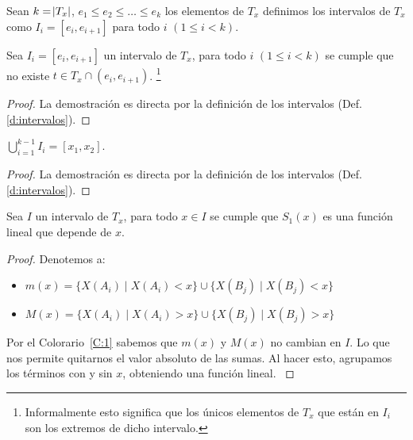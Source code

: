 \begin{definition}
    Sean $k = \abs{T_x}$, $e_1 \le e_2 \le \ldots \le e_k$ los elementos de $T_x$ definimos los intervalos de $T_x$ como $I_{i} = [ e_i, e_{i+1}]$ para todo $i$ $(1 \le i < k)$.
    \label{d:intervalos}
\end{definition}

\begin{collorary}
    Sea $I_i = [e_i, e_{i+1}]$ un intervalo de $T_x$, para todo $i$ $(1 \le i < k)$ se cumple que no existe $t \in T_x \cap (e_i, e_{i+1})$. \footnote{Informalmente esto significa que los únicos elementos de $T_x$ que están en $I_i$ son los extremos de dicho intervalo.}
    \label{C:1}
\end{collorary}

\begin{proof}
    La demostración es directa por la definición de los intervalos (Def. \ref{d:intervalos}).
\end{proof}

\begin{collorary}
    $\displaystyle \bigcup_{i=1}^{k-1} I_i = [x_1, x_2]$.
    \label{C:2}
\end{collorary}

\begin{proof}
    La demostración es directa por la definición de los intervalos (Def. \ref{d:intervalos}).
\end{proof}

\begin{proposition}
    Sea $I$ un intervalo de $T_x$, para todo $x \in I$ se cumple que $S_1(x)$ es una función lineal que depende de $x$.
    \label{def_fnok}
\end{proposition} 

\begin{proof}
    \hfill

    Denotemos a:

    \begin{itemize}[label=\textbullet]
        \item $m(x) = \{ X(A_i) \mid X(A_i) < x \} \cup \{ X(B_j) \mid X(B_j) < x \}$
        \item $M(x) = \{ X(A_i) \mid X(A_i) > x \} \cup \{ X(B_j) \mid X(B_j) > x \}$
    \end{itemize}

    Por el Colorario~\ref{C:1} sabemos que $m(x)$ y $M(x)$ no cambian en $I$. Lo que nos permite quitarnos el valor absoluto de las sumas. Al hacer esto, agrupamos los términos con y sin $x$, obteniendo una función lineal.
    \label{P:linear}
\end{proof}


